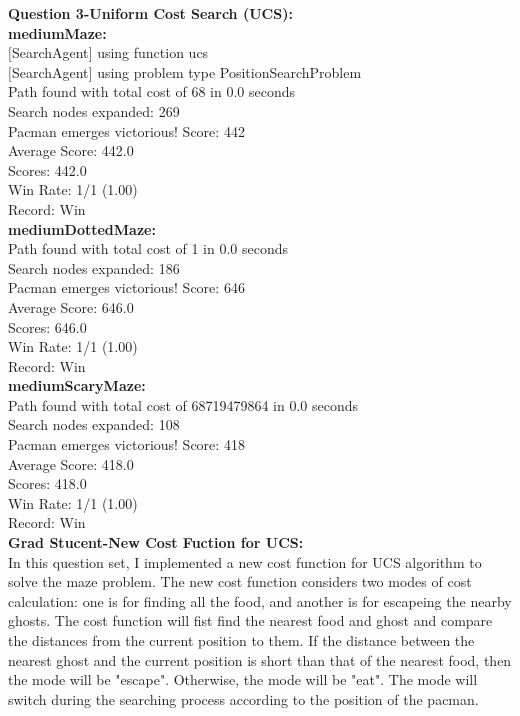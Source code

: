 \documentclass[11pt]{article}
\begin{document}
\newpage
\noindent
\textbf{Question 3-Uniform Cost Search (UCS):}\\
\textbf{mediumMaze:}\\
$[$SearchAgent$]$ using function ucs\\
$[$SearchAgent$]$ using problem type PositionSearchProblem\\
Path found with total cost of 68 in 0.0 seconds\\
Search nodes expanded: 269\\
Pacman emerges victorious! Score: 442\\
Average Score: 442.0\\
Scores:        442.0\\
Win Rate:      1/1 (1.00)\\
Record:        Win\\

\noindent
\textbf{mediumDottedMaze:}\\
Path found with total cost of 1 in 0.0 seconds\\
Search nodes expanded: 186\\
Pacman emerges victorious! Score: 646\\
Average Score: 646.0\\
Scores:        646.0\\
Win Rate:      1/1 (1.00)\\
Record:        Win\\

\noindent
\textbf{mediumScaryMaze:}\\
Path found with total cost of 68719479864 in 0.0 seconds\\
Search nodes expanded: 108\\
Pacman emerges victorious! Score: 418\\
Average Score: 418.0\\
Scores:        418.0\\
Win Rate:      1/1 (1.00)\\
Record:        Win\\

\newpage
\noindent
\textbf{Grad Stucent-New Cost Fuction for UCS:}\\
In this question set, I implemented a new cost function for UCS algorithm to solve the maze problem. The new cost function considers two modes of cost calculation: one is for finding all the food, and another is for escapeing the nearby ghosts. The cost function will fist find the nearest food and ghost and compare the distances from the current position to them. If the distance between the nearest ghost and the current position is short than that of the nearest food, then the mode will be "escape". Otherwise, the mode will be "eat". The mode will switch during the searching process according to the position of the pacman.\\
\end{document}
